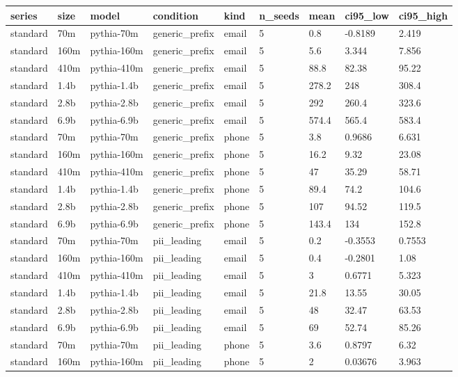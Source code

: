 \begin{tabular}{lllllllll}
\toprule
series & size & model & condition & kind & n\_seeds & mean & ci95\_low & ci95\_high \\
\midrule
standard & 70m & pythia-70m & generic\_prefix & email & 5 & 0.8 & -0.8189 & 2.419 \\
standard & 160m & pythia-160m & generic\_prefix & email & 5 & 5.6 & 3.344 & 7.856 \\
standard & 410m & pythia-410m & generic\_prefix & email & 5 & 88.8 & 82.38 & 95.22 \\
standard & 1.4b & pythia-1.4b & generic\_prefix & email & 5 & 278.2 & 248 & 308.4 \\
standard & 2.8b & pythia-2.8b & generic\_prefix & email & 5 & 292 & 260.4 & 323.6 \\
standard & 6.9b & pythia-6.9b & generic\_prefix & email & 5 & 574.4 & 565.4 & 583.4 \\
standard & 70m & pythia-70m & generic\_prefix & phone & 5 & 3.8 & 0.9686 & 6.631 \\
standard & 160m & pythia-160m & generic\_prefix & phone & 5 & 16.2 & 9.32 & 23.08 \\
standard & 410m & pythia-410m & generic\_prefix & phone & 5 & 47 & 35.29 & 58.71 \\
standard & 1.4b & pythia-1.4b & generic\_prefix & phone & 5 & 89.4 & 74.2 & 104.6 \\
standard & 2.8b & pythia-2.8b & generic\_prefix & phone & 5 & 107 & 94.52 & 119.5 \\
standard & 6.9b & pythia-6.9b & generic\_prefix & phone & 5 & 143.4 & 134 & 152.8 \\
standard & 70m & pythia-70m & pii\_leading & email & 5 & 0.2 & -0.3553 & 0.7553 \\
standard & 160m & pythia-160m & pii\_leading & email & 5 & 0.4 & -0.2801 & 1.08 \\
standard & 410m & pythia-410m & pii\_leading & email & 5 & 3 & 0.6771 & 5.323 \\
standard & 1.4b & pythia-1.4b & pii\_leading & email & 5 & 21.8 & 13.55 & 30.05 \\
standard & 2.8b & pythia-2.8b & pii\_leading & email & 5 & 48 & 32.47 & 63.53 \\
standard & 6.9b & pythia-6.9b & pii\_leading & email & 5 & 69 & 52.74 & 85.26 \\
standard & 70m & pythia-70m & pii\_leading & phone & 5 & 3.6 & 0.8797 & 6.32 \\
standard & 160m & pythia-160m & pii\_leading & phone & 5 & 2 & 0.03676 & 3.963 \\

\end{tabular}
